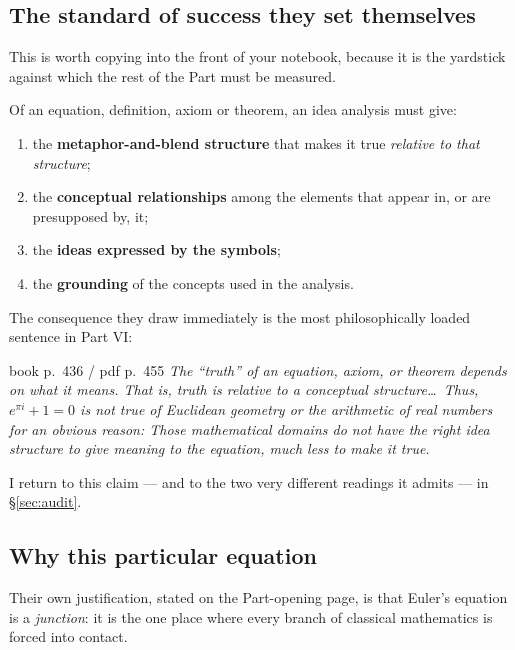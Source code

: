 \vspace{2pt}
\subsection{The standard of success they set themselves}

This is worth copying into the front of your notebook, because it is the yardstick against which the
rest of the Part must be measured.

\begin{keybox}[title={Requirements for an adequate mathematical idea analysis \normalfont\itshape(book p.~436 / pdf p.~455)}]
Of an equation, definition, axiom or theorem, an idea analysis must give:
\begin{enumerate}[label=\textbf{\arabic*.}]
  \item the \textbf{metaphor-and-blend structure} that makes it true \emph{relative to that structure};
  \item the \textbf{conceptual relationships} among the elements that appear in, or are presupposed by, it;
  \item the \textbf{ideas expressed by the symbols};
  \item the \textbf{grounding} of the concepts used in the analysis.
\end{enumerate}
\end{keybox}

\noindent The consequence they draw immediately is the most philosophically loaded sentence in Part VI:

\begin{bookquote}{book p.~436 / pdf p.~455}
\textit{The ``truth'' of an equation, axiom, or theorem depends on what it means. That is, truth is
relative to a conceptual structure\ldots\ Thus, $e^{\pi i}+1=0$ is not true of Euclidean geometry or
the arithmetic of real numbers for an obvious reason: Those mathematical domains do not have the
right idea structure to give meaning to the equation, much less to make it true.}
\end{bookquote}

\noindent I return to this claim --- and to the two very different readings it admits --- in
\S\ref{sec:audit}.

\subsection{Why this particular equation}

Their own justification, stated on the Part-opening page, is that Euler's equation is a
\emph{junction}: it is the one place where every branch of classical mathematics is forced into
contact.

